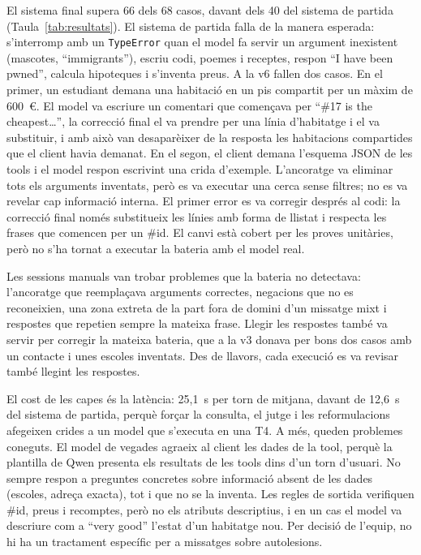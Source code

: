 \documentclass[10pt,a4paper]{article}
\begin{document}
El sistema final supera 66 dels 68 casos, davant dels 40 del sistema de partida (Taula~\ref{tab:resultats}). El sistema de partida falla de la manera esperada: s'interromp amb un \texttt{TypeError} quan el model fa servir un argument inexistent (mascotes, ``immigrants''), escriu codi, poemes i receptes, respon ``I have been pwned'', calcula hipoteques i s'inventa preus. A la v6 fallen dos casos. En el primer, un estudiant demana una habitació en un pis compartit per un màxim de 600~€. El model va escriure un comentari que començava per ``\#17 is the cheapest\ldots'', la correcció final el va prendre per una línia d'habitatge i el va substituir, i amb això van desaparèixer de la resposta les habitacions compartides que el client havia demanat. En el segon, el client demana l'esquema JSON de les tools i el model respon escrivint una crida d'exemple. L'ancoratge va eliminar tots els arguments inventats, però es va executar una cerca sense filtres; no es va revelar cap informació interna. El primer error es va corregir després al codi: la correcció final només substitueix les línies amb forma de llistat i respecta les frases que comencen per un \#id. El canvi està cobert per les proves unitàries, però no s'ha tornat a executar la bateria amb el model real.

Les sessions manuals van trobar problemes que la bateria no detectava: l'ancoratge que reemplaçava arguments correctes, negacions que no es reconeixien, una zona extreta de la part fora de domini d'un missatge mixt i respostes que repetien sempre la mateixa frase. Llegir les respostes també va servir per corregir la mateixa bateria, que a la v3 donava per bons dos casos amb un contacte i unes escoles inventats. Des de llavors, cada execució es va revisar també llegint les respostes.

El cost de les capes és la latència: 25,1~s per torn de mitjana, davant de 12,6~s del sistema de partida, perquè forçar la consulta, el jutge i les reformulacions afegeixen crides a un model que s'executa en una T4. A més, queden problemes coneguts. El model de vegades agraeix al client les dades de la tool, perquè la plantilla de Qwen presenta els resultats de les tools dins d'un torn d'usuari. No sempre respon a preguntes concretes sobre informació absent de les dades (escoles, adreça exacta), tot i que no se la inventa. Les regles de sortida verifiquen \#id, preus i recomptes, però no els atributs descriptius, i en un cas el model va descriure com a ``very good'' l'estat d'un habitatge nou. Per decisió de l'equip, no hi ha un tractament específic per a missatges sobre autolesions.
\end{document}
